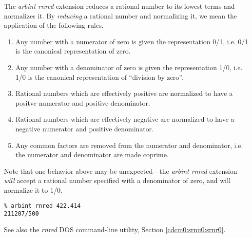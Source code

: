 \begin{tclcommandsynopsis}
\end{tclcommandsynopsis}

\begin{tclcommanddescription}
The \emph{arbint rnred} extension reduces a rational number to its lowest terms
and normalizes it.  By \emph{reducing} a rational number and
normalizing it, we mean the application of the following rules.

\begin{enumerate}
\item Any number with a numerator of zero is given the
      representation 0/1, i.e. 0/1 is the canonical 
	  representation of zero.
\item Any number with a denominator of zero is given
      the representation 1/0, i.e. 1/0 is the canonical
	  representation of ``division by zero''.
\item Rational numbers which are effectively positive
      are normalized to have a positve numerator and positive
	  denominator.
\item Rational numbers which are effectively negative are
      normalized to have a negative numerator and positive
	  denominator.
\item Any common factors are removed from the numerator and
      denominator, i.e. the numerator and denominator are
	  made coprime.
\end{enumerate}

Note that one behavior above may be unexpected---the
\emph{arbint rnred} extension \emph{will} accept a rational number
specified with a denominator of zero, and will normalize it to
1/0.
\end{tclcommanddescription}

\begin{tclcommandsampleinvocations}
\begin{scriptsize}
\begin{verbatim}
% arbint rnred 422.414
211207/500
\end{verbatim}
\end{scriptsize}
\end{tclcommandsampleinvocations}

\begin{tclcommandseealso}
See also the \emph{rnred} DOS command-line utility, 
Section \ref{cdcm0:srnu0:srnr0}.
\end{tclcommandseealso}

